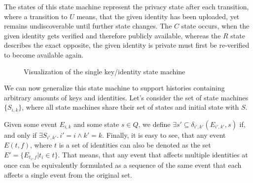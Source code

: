 The states of this state machine represent the privacy state after each transition, where a transition to \(U\) means, that the given identity has been uploaded, yet remains undiscoverable until further state changes. The \(C\) state occurs, when the given identity gets verified and therefore publicly available, whereas the \(R\) state describes the exact opposite, the given identity is private must first be re-verified to become available again.

\begin{figure}[H]
    \centering
    \caption{Visualization of the single key/identity state machine}
\end{figure}




We can now generalize this state machine to support histories containing arbitrary amounts of keys and identities. Let's consider the set of state machines \(\{S_{i,k}\}\), where all state machines share their set of states and initial state with \(S\). 

Given some event \(E_{i,k}\) and some state \(s \in Q\), we define \( \exists {s'} \subseteq \delta_{i',k'}(E_{i',k'},s) \) if, and only if \( \exists S_{i',k'} .\, i' = i \wedge k' = k\).
Finally, it is easy to see, that any event \(E(t,f)\), where \(t\) is a set of identities can also be denoted as the set \(E' = \{E_{t_i,f} | t_i \in t\} \). That means, that any event that affects multiple identities at once can be equivalently formulated as a sequence of the same event that each affects a single event from the original set.



